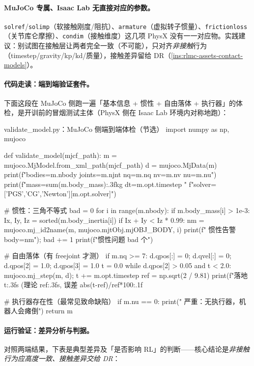 \paragraph{MuJoCo 专属、Isaac Lab 无直接对应的参数。}\texttt{solref}/\texttt{solimp}（软接触刚度/阻抗）、\texttt{armature}（虚拟转子惯量）、\texttt{frictionloss}（关节库仑摩擦）、\texttt{condim}（接触维度）这几项 PhysX 没有一一对应物。实践建议：别试图在接触层让两者完全一致（不可能），只对齐\emph{非接触}行为（timestep/gravity/kp/kd/质量），接触差异留给 DR（\cref{ins:rlmc-assets-contact-models}）。

\paragraph{代码走读：端到端验证套件。}下面这段在 MuJoCo 侧跑一遍「基本信息 + 惯性 + 自由落体 + 执行器」的体检，是开训前的冒烟测试主体（PhysX 侧在 Isaac Lab 环境内对称地跑）：

\begin{codebox}[Python]{validate\_model.py：MuJoCo 侧端到端体检（节选）}
import numpy as np, mujoco

def validate_model(mjcf_path):
    m = mujoco.MjModel.from_xml_path(mjcf_path)
    d = mujoco.MjData(m)
    print(f"bodies={m.nbody} joints={m.njnt} nq={m.nq} nv={m.nv} nu={m.nu}")
    print(f"mass={sum(m.body_mass):.3f}kg dt={m.opt.timestep} "
          f"solver={['PGS','CG','Newton'][m.opt.solver]}")

    # 惯性：三角不等式
    bad = 0
    for i in range(m.nbody):
        if m.body_mass[i] > 1e-3:
            Ix, Iy, Iz = sorted(m.body_inertia[i])
            if Ix + Iy < Iz * 0.99:
                nm = mujoco.mj_id2name(m, mujoco.mjtObj.mjOBJ_BODY, i)
                print(f"  惯性告警 body={nm}"); bad += 1
    print(f"惯性问题 {bad} 个")

    # 自由落体（有 freejoint 才测）
    if m.nq >= 7:
        d.qpos[:] = 0; d.qvel[:] = 0; d.qpos[2] = 1.0; d.qpos[3] = 1.0
        t = 0.0
        while d.qpos[2] > 0.05 and t < 2.0:
            mujoco.mj_step(m, d); t += m.opt.timestep
        ref = np.sqrt(2 / 9.81)
        print(f"落地 {t:.3f}s (理论 {ref:.3f}s, 误差 {abs(t-ref)/ref*100:.1f}%

    # 执行器存在性（最常见致命缺陷）
    if m.nu == 0:
        print("  严重：无执行器，机器人会瘫倒")
    return m
\end{codebox}

\paragraph{运行验证：差异分析与判据。}对照两端结果，下表是典型差异及「是否影响 RL」的判断——核心结论是\emph{非接触行为应高度一致、接触差异交给 DR}：

